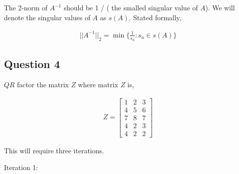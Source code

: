 The 2-norm of \(A^{-1}\) should be 1 / ( the smalled singular value of \(A\)).
We will denote the singular values of \(A\) as \(s(A)\).
Stated formally,

\begin{eqnarray}
  ||A^{-1}||_2 = \min \{\frac{1}{s_a} : s_a \in s(A) \}
\end{eqnarray}

\newpage
\subsection{Question 4}

\(QR\) factor the matrix \(Z\) where matrix \(Z\) is,

\begin{eqnarray}
  Z = 
  \begin{bmatrix}
    1 & 2 & 3 \\
    4 & 5 & 6 \\
    7 & 8 & 7 \\
    4 & 2 & 3 \\
    4 & 2 & 2
  \end{bmatrix}
\end{eqnarray}
  
This will require three iterations.

Iteration 1:

